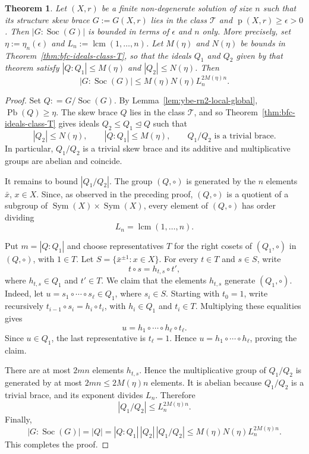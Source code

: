 \documentclass[11pt, oneside]{amsart}
\numberwithin{equation}{section}
\theoremstyle{plain}
\newtheorem{thm}[equation]{Theorem}
\theoremstyle{definition}
\newcommand{\Pb}{\operatorname{Pb} }
\newcommand{\Soc}{\operatorname{Soc} }
\begin{document}
 \begin{thm} %
Let $(X,r)$ be a finite non-degenerate solution of size $n$ such that its structure skew brace $G:=G(X,r)$ lies in the class $\mathcal{T}$  and 
$\operatorname{p}(X,r)\geqslant\epsilon>0$. Then
$|G:\Soc(G)|$ is bounded in terms of $\epsilon$ and $n$ only.
More precisely, set $\eta :=\eta_n(\epsilon)$ and
$L_n :=\operatorname{lcm}(1,\ldots,n)$. Let $M(\eta)$ and $N(\eta)$ be bounds
in Theorem~\ref{thm:bfc-ideals-class-T}, so that the ideals $Q_1$ and $Q_2$ given
by that theorem satisfy $|Q:Q_1|\leqslant M(\eta)$ and
$|Q_2|\leqslant N(\eta)$. Then
$$
|G :\Soc(G)|
\leqslant M(\eta)N(\eta)L_n^{2M(\eta)n}.
$$ 
\end{thm}
\begin{proof}
Set $Q: =G/\Soc(G)$. By
Lemma~\ref{lem:ybe-rn2-local-global}, $\Pb(Q)\geqslant\eta$. The skew brace $Q$
lies in the class $\mathcal{T}$, and  so
Theorem~\ref{thm:bfc-ideals-class-T} gives ideals
$Q_2\leqslant Q_1\trianglelefteq Q$ such that
$$
|Q_2|\leqslant N(\eta),\qquad |Q:Q_1|\leqslant M(\eta),
\qquad Q_1/Q_2\text{ is a trivial brace}.
$$
In particular, $Q_1/Q_2$ is a trivial skew brace and its additive and
multiplicative groups are abelian and coincide.

It remains to bound $|Q_1/Q_2|$. The group $(Q,\circ)$ is generated by the
$n$ elements $\bar x$, $x\in X$. Since, as observed in the preceding proof, $(Q,\circ)$ is a quotient of a subgroup of
$\operatorname{Sym}(X)\times\operatorname{Sym}(X)$, every element of
$(Q,\circ)$ has order dividing
$$
L_n=\operatorname{lcm}(1,\ldots,n).
$$

Put $m=|Q:Q_1|$ and choose representatives $T$ for the right cosets of
$(Q_1,\circ)$ in $(Q,\circ)$, with $1\in T$. Let
$S=\{\bar x^{\pm1}:x\in X\}$. For every $t\in T$ and $s\in S$, write
$$
t\circ s=h_{t,s}\circ t',
$$
where $h_{t,s}\in Q_1$ and $t'\in T$. We claim that the elements $h_{t,s}$
generate $(Q_1,\circ)$. Indeed, let
$u=s_1\circ\cdots\circ s_\ell\in Q_1$, where $s_i\in S$. Starting with
$t_0=1$, write recursively
$t_{i-1}\circ s_i=h_i\circ t_i$, with $h_i\in Q_1$ and $t_i\in T$.
Multiplying these equalities gives
$$
u=h_1\circ\cdots\circ h_\ell\circ t_\ell.
$$
Since $u\in Q_1$, the last representative is $t_\ell=1$. Hence
$u=h_1\circ\cdots\circ h_\ell$, proving the claim.

There are at most $2mn$ elements $h_{t,s}$. Hence the multiplicative group of
$Q_1/Q_2$ is generated by at most
$2mn\leqslant2M(\eta)n$ elements. It is abelian because $Q_1/Q_2$ is a trivial
brace, and its exponent divides $L_n$. Therefore
$$
|Q_1/Q_2|\leqslant L_n^{2M(\eta)n}.
$$
Finally,
$$
|G:\Soc(G)|=|Q|=|Q:Q_1|\,|Q_2|\,|Q_1/Q_2|
\leqslant M(\eta)N(\eta)L_n^{2M(\eta)n}.
$$
This completes the proof.
\end{proof}
\end{document}
